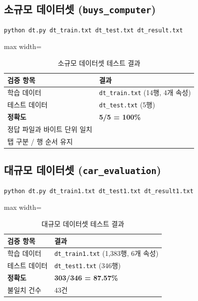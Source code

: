\documentclass[12pt, a4paper]{article}
\newcommand{\cmark}{\ding{51}}
\begin{document}
\subsection{소규모 데이터셋 (\texttt{buys\_computer})}

\begin{verbatim}
python dt.py dt_train.txt dt_test.txt dt_result.txt
\end{verbatim}

\begin{table}[h]
\centering
\begin{adjustbox}{max width=\textwidth}
\begin{tabular}{ll}
\toprule
\textbf{검증 항목} & \textbf{결과} \\
\midrule
학습 데이터                     & \texttt{dt\_train.txt} (14행, 4개 속성) \\
테스트 데이터                   & \texttt{dt\_test.txt} (5행) \\
\textbf{정확도}                 & \textbf{5/5 = 100\%} \cmark \\
정답 파일과 바이트 단위 일치    & \cmark \\
탭 구분 / 행 순서 유지          & \cmark \\
\bottomrule
\end{tabular}
\end{adjustbox}
\caption{소규모 데이터셋 테스트 결과}
\end{table}

\subsection{대규모 데이터셋 (\texttt{car\_evaluation})}

\begin{verbatim}
python dt.py dt_train1.txt dt_test1.txt dt_result1.txt
\end{verbatim}

\begin{table}[h]
\centering
\begin{adjustbox}{max width=\textwidth}
\begin{tabular}{ll}
\toprule
\textbf{검증 항목} & \textbf{결과} \\
\midrule
학습 데이터        & \texttt{dt\_train1.txt} (1,383행, 6개 속성) \\
테스트 데이터      & \texttt{dt\_test1.txt} (346행) \\
\textbf{정확도}    & \textbf{303/346 = 87.57\%} \\
불일치 건수        & 43건 \\
\bottomrule
\end{tabular}
\end{adjustbox}
\caption{대규모 데이터셋 테스트 결과}
\end{table}
\end{document}
